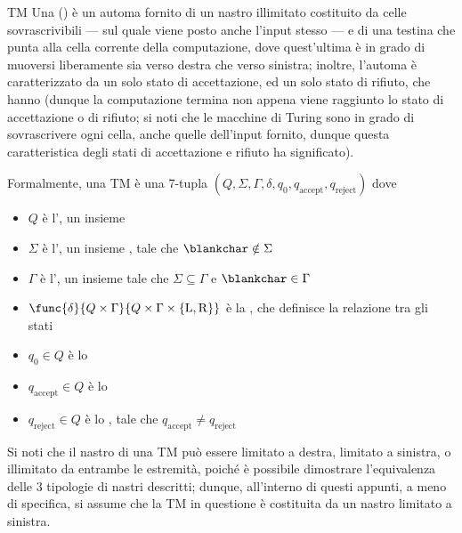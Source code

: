 \documentclass[a4paper, 12pt]{report}
\begin{document}
    \begin{frameddefn}[label={tm}, breakable]{TM}
        Una  () è un automa fornito di un nastro illimitato costituito da celle sovrascrivibili --- sul quale viene posto anche l'input stesso --- e di una testina che punta alla cella corrente della computazione, dove quest'ultima è in grado di muoversi liberamente sia verso destra che verso sinistra; inoltre, l'automa è caratterizzato da un solo stato di accettazione, ed un solo stato di rifiuto, che hanno  (dunque la computazione termina non appena viene raggiunto lo stato di accettazione o di rifiuto; si noti che le macchine di Turing sono in grado di sovrascrivere ogni cella, anche quelle dell'input fornito, dunque questa caratteristica degli stati di accettazione e rifiuto ha significato).

        Formalmente, una TM è una 7-tupla $(Q, \Sigma, \Gamma, \delta, q_0, q_\mathrm{accept}, q_\mathrm{reject})$ dove

        \begin{itemize}
            \item $Q$ è l', un insieme 
            \item $\Sigma$ è l', un insieme , tale che $\blankchar \notin \Sigma$
            \item $\Gamma$ è l', un insieme  tale che $\Sigma \subseteq \Gamma$ e $\blankchar \in \Gamma$
            \item $\func{\delta}{Q \times \Gamma}{Q \times \Gamma \times \{ \mathrm L, \mathrm R\}}$ è la , che definisce la relazione tra gli stati
            \item $q_0 \in Q$ è lo 
            \item $q_\mathrm{accept} \in Q$ è lo 
            \item $q_\mathrm{reject} \in Q$ è lo , tale che $q_\mathrm{accept} \neq q_\mathrm{reject}$
        \end{itemize}

        Si noti che il nastro di una TM può essere limitato a destra, limitato a sinistra, o illimitato da entrambe le estremità, poiché è possibile dimostrare l'equivalenza delle 3 tipologie di nastri descritti; dunque, all'interno di questi appunti, a meno di specifica, si assume che la TM in questione è costituita da un nastro limitato a sinistra.


\end{frameddefn}
\end{document}
